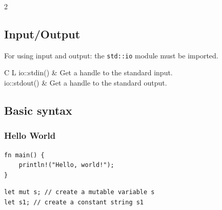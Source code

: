 \documentclass[5pt]{article}
\begin{document}
\begin{multicols}{2}
\subsection{Input/Output}
For using input and output: the \texttt{std::io} module must be imported.\\
\begin{tabular}{C L}
    io::stdin()       & Get a handle to the standard input.\\
    io::stdout()      & Get a handle to the standard output.\\
\end{tabular}


\subsection{Basic syntax}
\subsubsection{Hello World}
\begin{verbatim}
fn main() {
    println!("Hello, world!");
}
\end{verbatim}

\begin{verbatim}
let mut s; // create a mutable variable s
let s1; // create a constant string s1
\end{verbatim}

\end{multicols}
\end{document}

